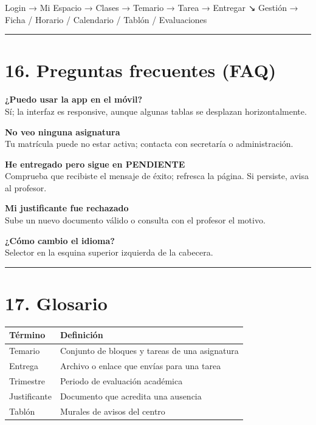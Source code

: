 \documentclass[
  spanish,
  11pt,
]{report}
\newenvironment{Shaded}{}{}
\newcommand{\NormalTok}[1]{#1}
\newcounter{none} %
\begin{document}
\begin{Shaded}
\begin{Highlighting}[]
\NormalTok{Login → Mi Espacio → Clases → Temario → Tarea → Entregar}
\NormalTok{                  ↘ Gestión → Ficha / Horario / Calendario / Tablón / Evaluaciones}
\end{Highlighting}
\end{Shaded}

\begin{center}\rule{0.5\linewidth}{0.5pt}\end{center}

\section{16. Preguntas frecuentes (FAQ)}\label{preguntas-frecuentes-faq}

\textbf{¿Puedo usar la app en el móvil?}\\
Sí; la interfaz es responsive, aunque algunas tablas se desplazan
horizontalmente.

\textbf{No veo ninguna asignatura}\\
Tu matrícula puede no estar activa; contacta con secretaría o
administración.

\textbf{He entregado pero sigue en PENDIENTE}\\
Comprueba que recibiste el mensaje de éxito; refresca la página. Si
persiste, avisa al profesor.

\textbf{Mi justificante fue rechazado}\\
Sube un nuevo documento válido o consulta con el profesor el motivo.

\textbf{¿Cómo cambio el idioma?}\\
Selector en la esquina superior izquierda de la cabecera.

\begin{center}\rule{0.5\linewidth}{0.5pt}\end{center}

\section{17. Glosario}\label{glosario}

{\def\LTcaptype{none} %
\begin{longtable}[]{@{}ll@{}}
\toprule\noalign{}
Término & Definición \\
\midrule\noalign{}
\endhead
\bottomrule\noalign{}
\endlastfoot
Temario & Conjunto de bloques y tareas de una asignatura \\
Entrega & Archivo o enlace que envías para una tarea \\
Trimestre & Periodo de evaluación académica \\
Justificante & Documento que acredita una ausencia \\
Tablón & Murales de avisos del centro \\
\end{longtable}
}
\end{document}
